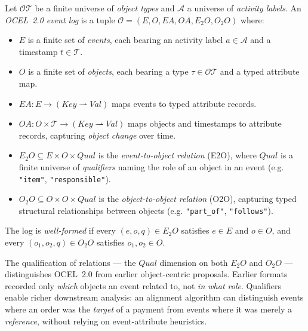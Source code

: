 \begin{definition}
\label{def:ocel20}
Let $\mathcal{OT}$ be a finite universe of \emph{object types} and
$\mathcal{A}$ a universe of \emph{activity labels}. An \emph{OCEL~2.0 event
log} is a tuple $\mathcal{O} = (E, O, \mathit{EA}, \mathit{OA}, E_2O, O_2O)$
where:
\begin{itemize}
  \item $E$ is a finite set of \emph{events}, each bearing an activity label
        $a \in \mathcal{A}$ and a timestamp $t \in \mathcal{T}$.
  \item $O$ is a finite set of \emph{objects}, each bearing a type
        $\tau \in \mathcal{OT}$ and a typed attribute map.
  \item $\mathit{EA} : E \to (\mathit{Key} \rightharpoonup \mathit{Val})$ maps
        events to typed attribute records.
  \item $\mathit{OA} : O \times \mathcal{T} \to (\mathit{Key}
        \rightharpoonup \mathit{Val})$ maps objects and timestamps to attribute
        records, capturing \emph{object change} over time.
  \item $E_2O \subseteq E \times O \times \mathit{Qual}$ is the
        \emph{event-to-object relation} (E2O), where $\mathit{Qual}$ is a
        finite universe of \emph{qualifiers} naming the role of an object in
        an event (e.g. \texttt{"item"}, \texttt{"responsible"}).
  \item $O_2O \subseteq O \times O \times \mathit{Qual}$ is the
        \emph{object-to-object relation} (O2O), capturing typed structural
        relationships between objects (e.g. \texttt{"part\_of"},
        \texttt{"follows"}).
\end{itemize}
The log is \emph{well-formed} if every $(e, o, q) \in E_2O$ satisfies
$e \in E$ and $o \in O$, and every $(o_1, o_2, q) \in O_2O$ satisfies
$o_1, o_2 \in O$.
\end{definition}

The qualification of relations --- the $\mathit{Qual}$ dimension on both $E_2O$
and $O_2O$ --- distinguishes OCEL~2.0 from earlier object-centric proposals.
Earlier formats~\cite{ghahfarokhi2021ocel} recorded only \emph{which} objects
an event related to, not \emph{in what role}. Qualifiers enable richer
downstream analysis: an alignment algorithm can distinguish events where an
order was the \emph{target} of a payment from events where it was merely a
\emph{reference}, without relying on event-attribute heuristics.

